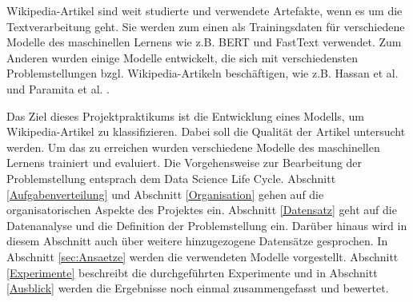 \label{Einleitung}
Wikipedia-Artikel sind weit studierte und verwendete Artefakte, wenn es um die Textverarbeitung geht. Sie werden zum einen als Trainingsdaten für verschiedene Modelle des maschinellen Lernens wie z.B. BERT \cite{Devlin2018} und FastText \cite{Bojanowski2016} verwendet. Zum Anderen wurden einige Modelle entwickelt, die sich mit verschiedensten Problemstellungen bzgl. Wikipedia-Artikeln beschäftigen, wie z.B. Hassan et al. \cite{Shavarani2019} und Paramita et al. \cite{Das2024}.

Das Ziel dieses Projektpraktikums ist die Entwicklung eines Modells, um Wikipedia-Artikel zu klassifizieren. Dabei soll die Qualität der Artikel untersucht werden. Um das zu erreichen wurden verschiedene Modelle des maschinellen Lernens trainiert und evaluiert. Die Vorgehensweise zur Bearbeitung der Problemstellung entsprach dem Data Science Life Cycle. Abschnitt \ref{Aufgabenverteilung} und Abschnitt \ref{Organisation} gehen auf die organisatorischen Aspekte des Projektes ein. Abschnitt \ref{Datensatz} geht auf die Datenanalyse und die Definition der Problemstellung ein. Darüber hinaus wird in diesem Abschnitt auch über weitere hinzugezogene Datensätze gesprochen. In Abschnitt \ref{sec:Ansaetze} werden die verwendeten Modelle vorgestellt.
Abschnitt \ref{Experimente} beschreibt die durchgeführten Experimente und in Abschnitt \ref{Ausblick} werden die Ergebnisse noch einmal zusammengefasst und bewertet.

